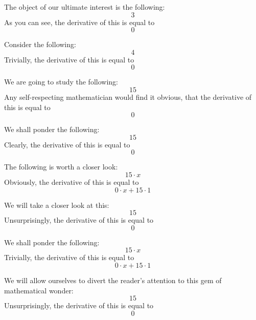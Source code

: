 \documentclass{article}
\begin{document}
The object of our ultimate interest is the following:
\begin{equation}
3 
\end{equation}
As you can see, the derivative of this is equal to
\begin{equation}
0 
\end{equation}

Consider the following:
\begin{equation}
4 
\end{equation}
Trivially, the derivative of this is equal to
\begin{equation}
0 
\end{equation}

We are going to study the following:
\begin{equation}
15 
\end{equation}
Any self-respecting mathematician would find it obvious, that the derivative of this is equal to
\begin{equation}
0 
\end{equation}

We shall ponder the following:
\begin{equation}
15 
\end{equation}
Clearly, the derivative of this is equal to
\begin{equation}
0 
\end{equation}

The following is worth a closer look:
\begin{equation}
15 \cdot x 
\end{equation}
Obviously, the derivative of this is equal to
\begin{equation}
0 \cdot x + 15 \cdot 1 
\end{equation}

We will take a closer look at this:
\begin{equation}
15 
\end{equation}
Unsurprisingly, the derivative of this is equal to
\begin{equation}
0 
\end{equation}

We shall ponder the following:
\begin{equation}
15 \cdot x 
\end{equation}
Trivially, the derivative of this is equal to
\begin{equation}
0 \cdot x + 15 \cdot 1 
\end{equation}

We will allow ourselves to divert the reader's attention to this gem of mathematical wonder:
\begin{equation}
15 
\end{equation}
Unsurprisingly, the derivative of this is equal to
\begin{equation}
0 
\end{equation}
\end{document}
